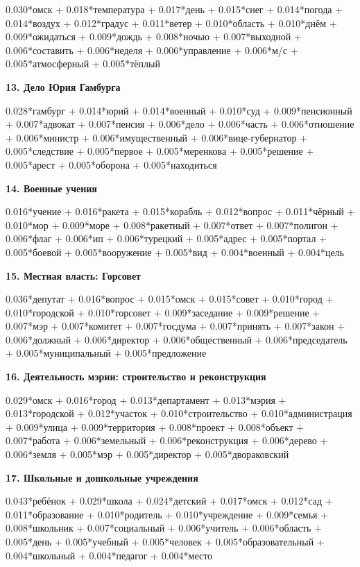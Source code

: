0.030*омск + 0.018*температура + 0.017*день + 0.015*снег + 0.014*погода + 0.014*воздух + 0.012*градус + 0.011*ветер + 0.010*область + 0.010*днём + 0.009*ожидаться + 0.009*дождь + 0.008*ночью + 0.007*выходной + 0.006*составить + 0.006*неделя + 0.006*управление + 0.006*м/с + 0.005*атмосферный + 0.005*тёплый

\textbf{13. Дело Юрия Гамбурга\footnotemark}

0.028*гамбург + 0.014*юрий + 0.014*военный + 0.010*суд + 0.009*пенсионный + 0.007*адвокат + 0.007*пенсия + 0.006*дело + 0.006*часть + 0.006*отношение + 0.006*министр + 0.006*имущественный + 0.006*вице-губернатор + 0.005*следствие + 0.005*первое + 0.005*меренкова + 0.005*решение + 0.005*арест + 0.005*оборона + 0.005*находиться

\textbf{14. Военные учения}

0.016*учение + 0.016*ракета + 0.015*корабль + 0.012*вопрос + 0.011*чёрный + 0.010*мор + 0.009*море + 0.008*ракетный + 0.007*ответ + 0.007*полигон + 0.006*флаг + 0.006*ип + 0.006*турецкий + 0.005*адрес + 0.005*портал + 0.005*боевой + 0.005*вооружение + 0.005*вид + 0.004*военный + 0.004*цель

\textbf{15. Местная власть: Горсовет}

0.036*депутат + 0.016*вопрос + 0.015*омск + 0.015*совет + 0.010*город + 0.010*городской + 0.010*горсовет + 0.009*заседание + 0.009*решение + 0.007*мэр + 0.007*комитет + 0.007*госдума + 0.007*принять + 0.007*закон + 0.006*должный + 0.006*директор + 0.006*общественный + 0.006*председатель + 0.005*муниципальный + 0.005*предложение

\textbf{16. Деятельность мэрии: строительство и реконструкция}

0.029*омск + 0.016*город + 0.013*департамент + 0.013*мэрия + 0.013*городской + 0.012*участок + 0.010*строительство + 0.010*администрация + 0.009*улица + 0.009*территория + 0.008*проект + 0.008*объект + 0.007*работа + 0.006*земельный + 0.006*реконструкция + 0.006*дерево + 0.006*земля + 0.005*мэр + 0.005*директор + 0.005*двораковский

\textbf{17. Школьные и дошкольные учреждения}

0.043*ребёнок + 0.029*школа + 0.024*детский + 0.017*омск + 0.012*сад + 0.011*образование + 0.010*родитель + 0.010*учреждение + 0.009*семья + 0.008*школьник + 0.007*социальный + 0.006*учитель + 0.006*область + 0.005*день + 0.005*учебный + 0.005*человек + 0.005*образовательный + 0.004*школьный + 0.004*педагог + 0.004*место

